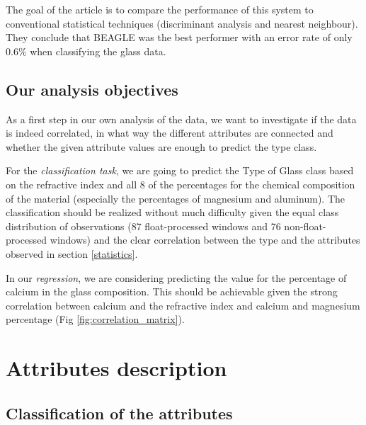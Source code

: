\documentclass[12pt]{article}
\begin{document}
The goal of the article is to compare the performance of this system to conventional statistical techniques (discriminant analysis and nearest neighbour). They conclude that BEAGLE was the best performer with an error rate of only 0.6\% when classifying the glass data.
\subsection{Our analysis objectives}
As a first step in our own analysis of the data, we want to investigate if the data is indeed correlated, in what way the different attributes are connected and whether the given attribute values are enough to predict the type class.

For the  \textit{classification task}, we are going to predict the Type of Glass class based on the refractive index and all 8 of the percentages for the chemical composition of the material (especially the percentages of magnesium and aluminum). The classification should be realized without much difficulty given the equal class distribution of observations (87 float-processed windows and 76 non-float-processed windows) and the clear correlation between the type and the attributes observed in section \ref{statistics}.

In our \textit{regression}, we are considering predicting the value for the percentage of calcium in the glass composition. This should be achievable given the strong correlation between calcium and the refractive index and calcium and magnesium percentage (Fig \ref{fig:correlation_matrix}).

\section{Attributes description}
\subsection{Classification of the attributes}
\end{document}
